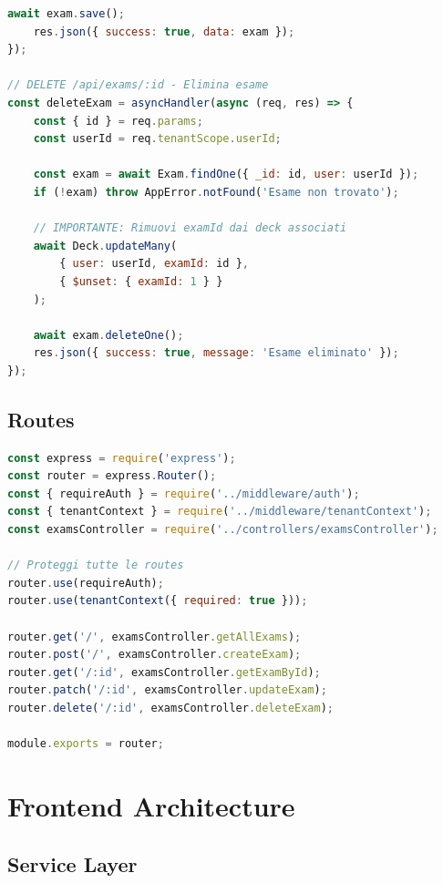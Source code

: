\documentclass[11pt,a4paper]{article}
\begin{document}
\begin{lstlisting}[language=JavaScript, caption={Exams Controller - server/controllers/examsController.js}]
    await exam.save();
    res.json({ success: true, data: exam });
});

// DELETE /api/exams/:id - Elimina esame
const deleteExam = asyncHandler(async (req, res) => {
    const { id } = req.params;
    const userId = req.tenantScope.userId;
    
    const exam = await Exam.findOne({ _id: id, user: userId });
    if (!exam) throw AppError.notFound('Esame non trovato');
    
    // IMPORTANTE: Rimuovi examId dai deck associati
    await Deck.updateMany(
        { user: userId, examId: id },
        { $unset: { examId: 1 } }
    );
    
    await exam.deleteOne();
    res.json({ success: true, message: 'Esame eliminato' });
});
\end{lstlisting}

\subsection{Routes}

\begin{lstlisting}[language=JavaScript, caption={Exam Routes - server/routes/exams.js}]
const express = require('express');
const router = express.Router();
const { requireAuth } = require('../middleware/auth');
const { tenantContext } = require('../middleware/tenantContext');
const examsController = require('../controllers/examsController');

// Proteggi tutte le routes
router.use(requireAuth);
router.use(tenantContext({ required: true }));

router.get('/', examsController.getAllExams);
router.post('/', examsController.createExam);
router.get('/:id', examsController.getExamById);
router.patch('/:id', examsController.updateExam);
router.delete('/:id', examsController.deleteExam);

module.exports = router;
\end{lstlisting}

\section{Frontend Architecture}\label{sec:frontend}

\subsection{Service Layer}
\end{document}
